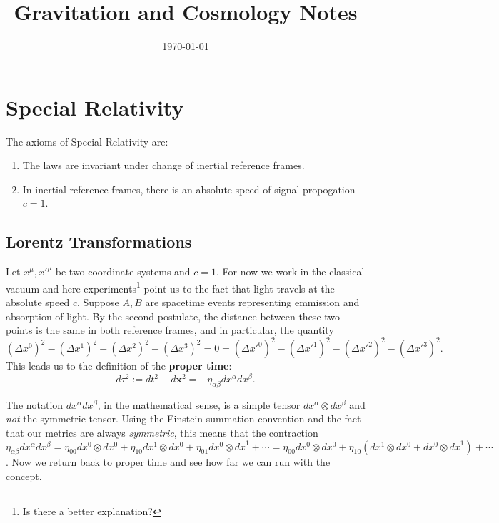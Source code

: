 \documentclass[11pt]{report}
\date{\today}
\title{Gravitation and Cosmology Notes}
\author{}
\newcommand{\ten}{\otimes}
\theoremstyle{plain}
\theoremstyle{definition}
\theoremstyle{remark}
\begin{document}
\maketitle

\chapter{Special Relativity}

The axioms of Special Relativity are:
\begin{enumerate}
    \item The laws are invariant under change of inertial reference frames.
    \item In inertial reference frames, there is an absolute speed of
        signal propogation $c=1$.
\end{enumerate}

\section{Lorentz Transformations}
Let $x^\mu,x'^\mu$ be two coordinate systems and $c=1$. For now we work in the
classical vacuum and here experiments\footnote{Is there a better explanation?}
point us to the fact that light travels at the absolute speed $c$.
Suppose $A,B$ are spacetime events representing emmission and absorption of
light. By the second postulate, the distance between these two points is the
same in both reference frames, and in particular, the quantity 
\[(\Delta x^0)^2-(\Delta x^1)^2-(\Delta x^2)^2-(\Delta x^3)^2 = 0 = (\Delta
x'^0)^2-(\Delta x'^1)^2-(\Delta x'^2)^2-(\Delta x'^3)^2.\]
This leads us to the definition of the \textbf{proper time}:
\[d\tau^2 := dt^2 - d\bm x^2 = -\eta_{\alpha\beta}dx^\alpha dx^\beta.\]

The notation $dx^\alpha dx^\beta$, in the mathematical sense, is a simple tensor
$dx^\alpha\ten dx^\beta$ and \emph{not} the symmetric tensor. Using the Einstein
summation convention and the fact that our metrics are always \emph{symmetric},
this means that the contraction $\eta_{\alpha\beta}dx^\alpha dx^\beta
=\eta_{00}dx^0\ten dx^0+\eta_{10}dx^1\ten dx^0+\eta_{01}dx^0\ten{dx}^1+\cdots
=\eta_{00}dx^0\ten dx^0+\eta_{10}(dx^1\ten dx^0+dx^0\ten{dx}^1)+\cdots$. Now we
return back to proper time and see how far we can run with the concept.
\end{document}
